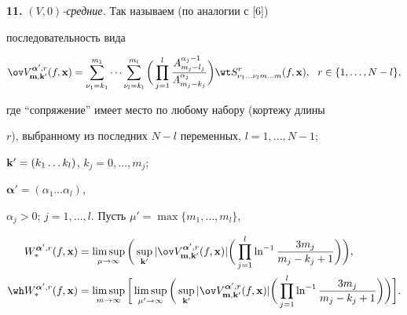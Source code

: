 \addtocounter{section}{1}


\setcounter{equation}{0}


\setcounter{lems}{0}


\setcounter{thms}{0}


 


{\bf 11.} {\it $(V,0)$-средние.} Так называем (по аналогии с [6])


последовательность вида


$$


\ov V_{{\bold m},{\bold k}'}^{{\boldsymbol {\alpha}}',r}(f,{\bold x})=


\sum_{\nu_1=k_1}^{m_1}\dotsb\sum_{\nu_l=k_l}^{m_l}\bigg(\prod_{j=1}^l \frac


{A_{m_j-l_j}^{\alpha_j-1}}{A_{m_j-k_j}^{\alpha_j}}\bigg)


\wt S^r_{\nu_1\dotsc\nu_l m\dotsc m}(f,


{\bold x}),\ \ r\in\{1,\dotsc,N-l\},


$$ 


где ``сопряжение'' имеет место по любому набору (кортежу длины


$r$), выбранному из последних $N-l$ переменных, $l=1,\dotsc,N-1$; 


${\bold k}'=(k_1\dotsc k_l)$, $k_j=0,\dotsc,m_j$;


${\boldsymbol {\alpha}}'=(\alpha_1\dotsc\alpha_l)$, 


$\alpha_j>0$; $j=1,\dotsc,l$. Пусть $\mu'=\max\{m_1,\dotsc,m_l\}$,


\begin{align*}


W_{*}^{{\boldsymbol {\alpha}}',r}(f,{\bold x})&=


\limsup_{\mu\to\infty}\bigg(\sup_{{\bold k}'}


|\ov V_{{\bold m},{\bold k}'}^{{\boldsymbol {\alpha}}',r}(f,{\bold x})|


\bigg(\prod_{j=1}^l \ln^{-1}\frac{3 m_j}{m_j-k_j+1}\bigg)\bigg), \\


%


\wh W_{*}^{{\boldsymbol {\alpha}}',r}(f,{\bold x})&=\limsup_{m\to\infty}


\bigg[\limsup_{\mu'\to\infty}\bigg(\sup_{{\bold k}'}


|\ov V_{{\bold m},{\bold k}'}^{{\boldsymbol {\alpha}}',r}(f,{\bold x})|


\bigg(\prod_{j=1}^l \ln^{-1}\frac{3 m_j}{m_j-k_j+1}\bigg)\bigg)\bigg].


\end{align*}








